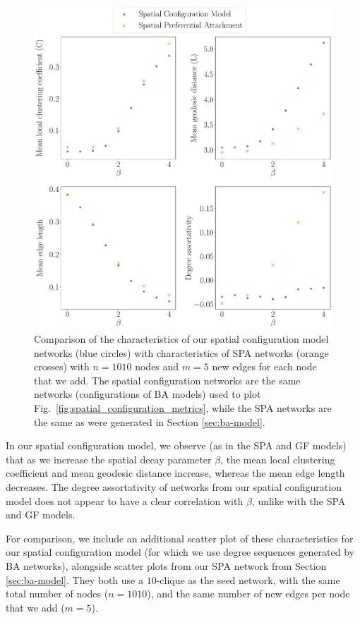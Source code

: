 \documentclass[%
 reprint,
 amsmath,amssymb,
 aps,
]{revtex4-1}
\begin{document}
\begin{figure}
    \centering
    \includegraphics[width=1.0\linewidth]{spatial_preferential_comparison.pdf}
    \caption{Comparison of the characteristics of our spatial configuration model networks (blue circles) with characteristics of SPA networks (orange crosses) with $n = 1010$ nodes and $m = 5$ new edges for each node that we add. {\color{red}The spatial configuration networks are the same networks (configurations of BA models) used to plot Fig.~\ref{fig:spatial_configuration_metrics}, while the SPA networks are the same as were generated in Section \ref{sec:ba-model}.}
}
    \label{fig:spatial_preferential_comparison}
\end{figure}
    

In our spatial configuration model, we observe (as in the {\color{red}SPA and GF} models) that as we increase the spatial decay parameter $\beta$, the mean local clustering coefficient and mean geodesic distance increase, whereas the mean edge length decreases. The degree assortativity of networks from our spatial configuration model does not appear to have a clear correlation with $\beta$, unlike with the {\color{red}SPA and GF models.}

For comparison, we include an additional scatter plot of these characteristics for our spatial configuration model (for which we use degree sequences generated by BA networks), {\color{red} alongside scatter plots from our SPA network from Section \ref{sec:ba-model}. They both use a $10$-clique as the seed network, with the same total number of nodes ($n=1010$), and the same number of new edges per node that we add ($m=5$). }
\end{document}
